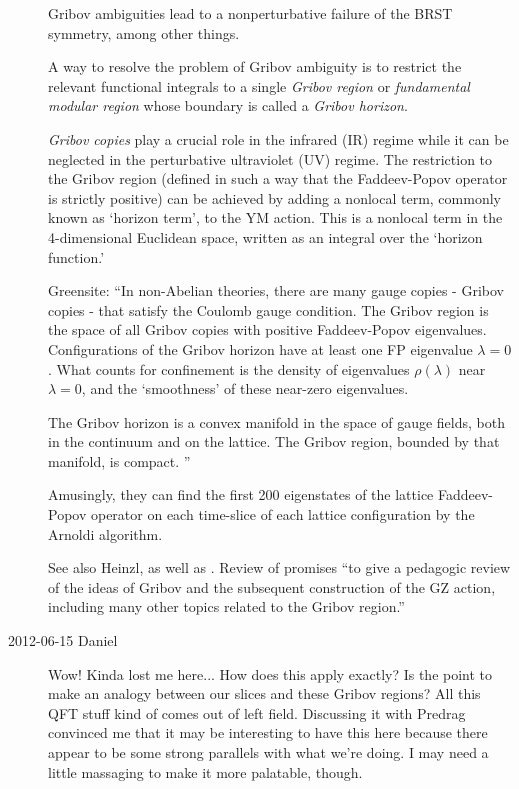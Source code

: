 \begin{description}
Gribov ambiguities lead to a nonperturbative failure of the BRST
symmetry, among other things.

A way to resolve the problem of Gribov ambiguity is to restrict the
relevant functional integrals to a single \emph{Gribov region} or {\em
fundamental modular region} whose boundary is called a \emph{Gribov
horizon}.

{\em Gribov copies} play a crucial role in the infrared (IR) regime while
it can be neglected in the perturbative ultraviolet (UV)
regime. The restriction to the Gribov region
(defined in such a way that the Faddeev-Popov operator is strictly
positive) can be achieved by adding a nonlocal term, commonly known as
`horizon term', to the YM action. This is a
nonlocal term in the 4-dimensional Euclidean space, written as an
integral over the `horizon function.'

Greensite: ``In non-Abelian theories, there are many gauge copies -
Gribov copies - that satisfy the Coulomb gauge condition. The Gribov
region is the space of all Gribov copies with positive Faddeev-Popov
eigenvalues. Configurations of the Gribov horizon have at least one FP
eigenvalue $\lambda =0$. What counts for confinement is the density of
eigenvalues $\rho(\lambda)$ near $\lambda =0$, and the `smoothness' of
these near-zero eigenvalues.

The Gribov horizon is a convex manifold in the space of gauge fields,
both in the continuum and on the lattice. The Gribov region, bounded by
that manifold, is compact.
''

Amusingly, they can find the first 200 eigenstates of the lattice
Faddeev-Popov operator on each time-slice of each lattice configuration
by the Arnoldi algorithm.

See also Heinzl, as well as
.
Review of  promises ``to give a pedagogic review of the
ideas of Gribov and the subsequent construction of the GZ action,
including many other topics related to the Gribov region.''


\item[2012-06-15 Daniel]
Wow! Kinda lost me here... How does this apply exactly? Is the
point to make an analogy between our slices and these Gribov regions?
All this QFT stuff kind of comes out of left field. Discussing
it with Predrag convinced me that it may be interesting to have this here
because there appear to be some strong parallels with what we're doing. I
may need a little massaging to make it more palatable, though.


\end{description}
